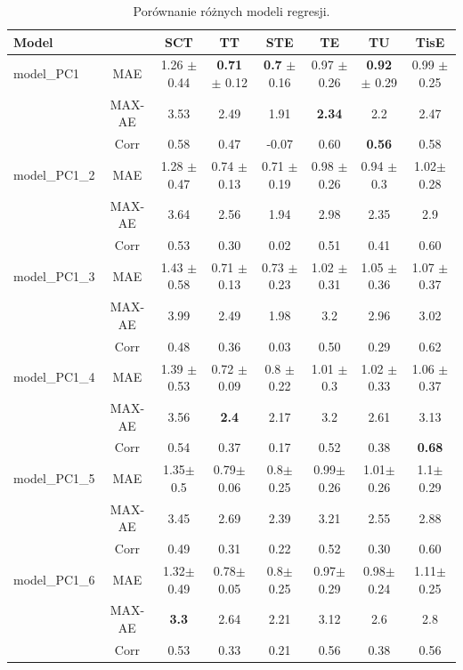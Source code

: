 \begin{table}[t]
	\caption{Porównanie różnych modeli regresji.}
	\scriptsize
	\begin{center}
		\begin{tabular}{lc||c|c|c|c|c|c}
			\textbf{Model} & & \textbf{SCT} & \textbf{TT} & \textbf{STE} & \textbf{TE} & \textbf{TU} & \textbf{TisE}\\ 
			
			\hline
			model\_PC1 & MAE & 1.26 $\pm$ 0.44 & \textbf{0.71} $\pm$ 0.12 & \textbf{0.7} $\pm$ 0.16 & 0.97 $\pm$ 0.26 & \textbf{0.92} $\pm$ 0.29 & 0.99 $\pm$ 0.25\\
			&MAX-AE &3.53&2.49&1.91&\textbf{2.34}&2.2&2.47\\
			&Corr &0.58&0.47&-0.07&0.60&\textbf{0.56}&0.58\\
			
			\hline
			model\_PC1\_2 & MAE & 1.28 $\pm$ 0.47 & 0.74 $\pm$ 0.13 & 0.71 $\pm$ 0.19 & 0.98 $\pm$ 0.26 & 0.94 $\pm$ 0.3 & 1.02$\pm$ 0.28\\
			&MAX-AE &3.64&2.56&1.94&2.98&2.35&2.9\\
			&Corr &0.53&0.30&0.02&0.51&0.41&0.60\\
			
			\hline
			model\_PC1\_3&MAE & 1.43 $\pm$ 0.58 & 0.71 $\pm$ 0.13 & 0.73 $\pm$ 0.23 & 1.02 $\pm$ 0.31 & 1.05 $\pm$ 0.36 & 1.07 $\pm$ 0.37\\
			&MAX-AE &3.99&2.49&1.98&3.2&2.96&3.02\\
			&Corr &0.48&0.36&0.03&0.50&0.29&0.62\\
			
			\hline
			model\_PC1\_4&MAE & 1.39 $\pm$ 0.53 & 0.72 $\pm$ 0.09 & 0.8 $\pm$ 0.22 & 1.01 $\pm$ 0.3 & 1.02 $\pm$ 0.33 & 1.06 $\pm$ 0.37\\
			&MAX-AE &3.56&\textbf{2.4}&2.17&3.2&2.61&3.13\\
			&Corr &0.54&0.37&0.17&0.52&0.38&\textbf{0.68}\\
			
			\hline
			model\_PC1\_5&MAE & 1.35$\pm$ 0.5 & 0.79$\pm$0.06 &0.8$\pm$0.25 &0.99$\pm$0.26 &1.01$\pm$0.26 &1.1$\pm$0.29\\
			&MAX-AE &3.45&2.69&2.39&3.21&2.55&2.88\\
			&Corr &0.49&0.31&0.22&0.52&0.30&0.60\\
			
			\hline
			model\_PC1\_6&MAE & 1.32$\pm$0.49 & 0.78$\pm$0.05 &0.8$\pm$0.25& 0.97$\pm$0.29 & 0.98$\pm$0.24 &1.11$\pm$0.25\\
			&MAX-AE &\textbf{3.3}&2.64&2.21&3.12&2.6&2.8\\
			&Corr &0.53&0.33&0.21&0.56&0.38&0.56\\
			

\end{tabular}
\end{center}
\end{table}

